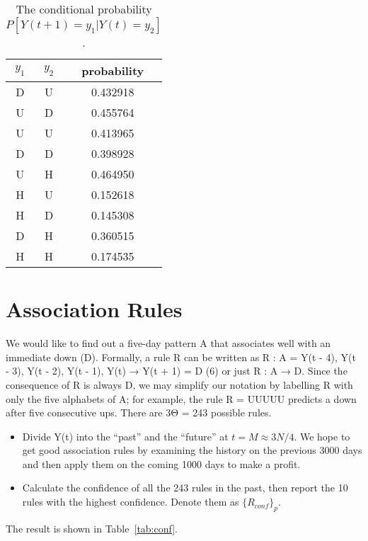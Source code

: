 \documentclass[runningheads]{llncs}
\begin{document}
\begin{table}
    \centering
    \caption{The conditional probability $P[Y(t+1)=y_1|Y(t)=y_2]$.}
    \label{tab:p12}
    \begin{tabularx}{\textwidth}{|C|C|C|}
        \hline
        $y_1$ & $y_2$ & probability \\
        \hline
        D     & U     & 0.432918    \\
        U     & D     & 0.455764    \\
        U     & U     & 0.413965    \\
        D     & D     & 0.398928    \\
        U     & H     & 0.464950    \\
        H     & U     & 0.152618    \\
        H     & D     & 0.145308    \\
        D     & H     & 0.360515    \\
        H     & H     & 0.174535    \\
        \hline
    \end{tabularx}
\end{table}

\section{Association Rules}
We would like to find out a five-day pattern A that associates well with an
immediate down (D). Formally, a rule R can be written as
R : A = {Y(t - 4), Y(t - 3), Y(t - 2), Y(t - 1), Y(t)} → Y(t + 1) = D (6)
or just R : A → D. Since the consequence of R is always D, we may simplify
our notation by labelling R with only the five alphabets of A; for example, the
rule R = UUUUU predicts a down after five consecutive ups. There are 3Θ =
243 possible rules.
\begin{itemize}
    \item Divide Y(t) into the “past” and the “future” at $t = M \approx 3N /4$. We hope to
          get good association rules by examining the history on the previous 3000
          days and then apply them on the coming 1000 days to make a profit.
    \item Calculate the confidence of all the 243 rules in the past, then report the 10
          rules with the highest confidence. Denote them as $\{R_{conf}\}_p$.
\end{itemize}

The result is shown in Table~\ref{tab:conf}.
\end{document}
